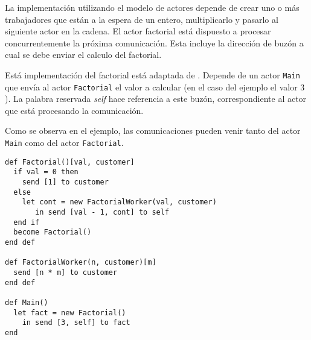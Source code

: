 La implementación utilizando el modelo de actores depende de crear uno o más trabajadores que están a la espera de un entero, multiplicarlo y pasarlo al siguiente actor en la cadena. El actor factorial está dispuesto a procesar concurrentemente la próxima comunicación. Esta incluye la dirección de buzón a cual se debe enviar el calculo del factorial.

Está implementación del factorial está adaptada de \cite{Agha:1986:AMC:7929}. Depende de un actor \lstinline[language=sal, style=simple]$Main$ que envía al actor \lstinline[language=sal, style=simple]$Factorial$ el valor a calcular (en el caso del ejemplo el valor $3$). La palabra reservada \textit{self} hace referencia a este buzón, correspondiente al actor que está procesando la comunicación.

Como se observa en el ejemplo, las comunicaciones pueden venir tanto del actor \lstinline[language=sal, style=simple]$Main$ como del actor \lstinline[language=sal, style=simple]$Factorial$.

\begin{lstlisting}[language=sal, style=simple]
def Factorial()[val, customer]
  if val = 0 then
    send [1] to customer
  else
    let cont = new FactorialWorker(val, customer)
       in send [val - 1, cont] to self
  end if 
  become Factorial()
end def

def FactorialWorker(n, customer)[m] 
  send [n * m] to customer
end def

def Main() 
  let fact = new Factorial() 
    in send [3, self] to fact
end
\end{lstlisting}

